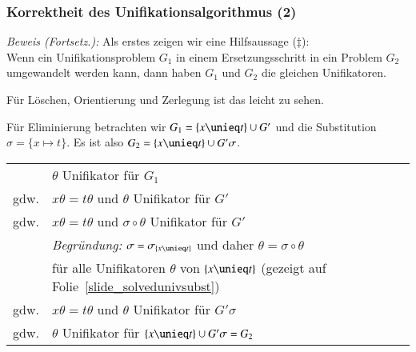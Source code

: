 \documentclass[onlymath]{beamer}
\begin{document}
\begin{frame}[t]\frametitle{Korrektheit des Unifikationsalgorithmus (2)}


\emph{Beweis (Fortsetz.):} Als erstes zeigen wir eine Hilfsaussage ($\ddagger$):\\[1ex]
Wenn ein Unifikationsproblem $G_1$ in einem Ersetzungsschritt in ein Problem $G_2$
umgewandelt werden kann, dann haben $G_1$ und $G_2$ die gleichen Unifikatoren.
\bigskip\pause

Für \alert{Löschen}, \alert{Orientierung} und \alert{Zerlegung} ist das leicht zu sehen.\medskip\pause

Für \alert{Eliminierung} betrachten wir $G_1=\{x\unieq t\}\cup G'$ und die Substitution
$\sigma=\{x\mapsto t\}$. Es ist also $G_2=\{x\unieq t\}\cup G'\sigma$.\medskip\pause

\begin{tabular}{rl}
	 & $\theta$ Unifikator für $G_1$ \pause\\[-0.5ex]
gdw. & $x\theta=t\theta$ und $\theta$ Unifikator für $G'$ \pause\\[-0.5ex]
gdw. & $x\theta=t\theta$ und $\sigma\circ\theta$ Unifikator für $G'$ \\[-1ex]
	& \emph{Begründung:} $\sigma=\sigma_{\{x\unieq t\}}$ und daher $\theta=\sigma\circ\theta$\\[-1ex]
	& für alle Unifikatoren $\theta$ von $\{x\unieq t\}$ (gezeigt auf Folie~\ref{slide_solvedunivsubst})\pause\\[-0.5ex]
gdw. & $x\theta=t\theta$ und $\theta$ Unifikator für $G'\sigma$ \pause\\[-0.5ex]
gdw. & $\theta$ Unifikator für $\{x\unieq t\}\cup G'\sigma=G_2$
\end{tabular}

\end{frame}
\end{document}
